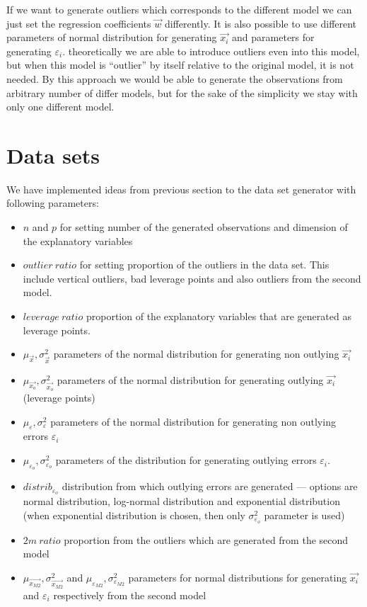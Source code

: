 If we want to generate outliers which corresponds to the different model we can just set the regression coefficients $\vec{w}$ differently. It is also possible to use different parameters of normal distribution for generating $\vec{x_i}$ and parameters for generating $\varepsilon_i$. theoretically we are able to introduce outliers even into this model, but when this model is ``outlier'' by itself relative to the original model, it is not needed. By this approach we would be able to generate the observations from arbitrary number of differ models, but for the sake of the simplicity we stay with only one different model. 

\section{Data sets}
We have implemented ideas from previous section to the data set generator with following parameters:
\begin{itemize}
    \item $n$ and $p$ for setting number of the generated observations and dimension of the explanatory variables
    \item $outlier~ratio$ for setting proportion of the outliers in the data set. This include vertical outliers, bad leverage points and also outliers from the second model.
    \item $leverage~ratio$ proportion of the explanatory variables that are generated as leverage points.
    \item $\mu_{\vec{x}}, \sigma^{2}_{\vec{x}}$ parameters of the normal distribution for generating non outlying $\vec{x_i}$
    \item $\mu_{\vec{x_o}}, \sigma^{2}_{\vec{x_o}}$ parameters of the normal distribution for generating outlying $\vec{x_i}$ (leverage points)
    \item $\mu_{\varepsilon}, \sigma^{2}_{\varepsilon}$ parameters of the normal distribution for generating non outlying errors $\varepsilon_i$
    \item $\mu_{\varepsilon_o}, \sigma^{2}_{\varepsilon_o}$ parameters of the distribution for generating outlying errors $\varepsilon_i$. 
    \item $distrib_{\varepsilon_o}$ distribution from which outlying errors are generated --- options are normal distribution, log-normal distribution and exponential distribution (when exponential distribution is chosen, then only $\sigma^{2}_{\varepsilon_o}$ parameter is used)
    \item $2m~ratio$ proportion from the outliers which are generated from the second model
    \item $\mu_{\vec{x_{M2}}}, \sigma^{2}_{\vec{x_{M2}}}$ and $\mu_{\varepsilon_{M2}}, \sigma^{2}_{\varepsilon_{M2}}$ parameters for normal distributions for generating $\vec{x_i}$ and $\varepsilon_i$ respectively from the second model
\end{itemize}


